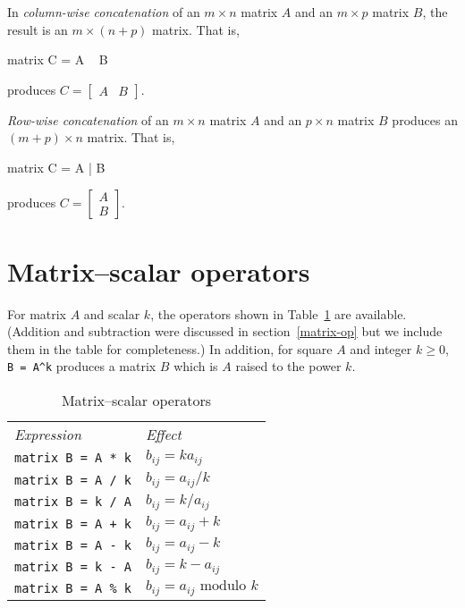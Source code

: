 In \textit{column-wise concatenation} of an $m\times n$ matrix $A$ and
an $m\times p$ matrix $B$, the result is an $m\times (n+p)$ matrix.
That is,
%
\begin{code}
matrix C = A ~ B
\end{code}
% 
produces $C = \left[ \begin{array}{cc} A & B \end{array} \right]$.

\textit{Row-wise concatenation} of an $m\times n$ matrix $A$ and
an $p\times n$ matrix $B$ produces an $(m+p) \times n$ matrix.
That is,
%
\begin{code}
matrix C = A | B
\end{code}
% 
produces $C = \left[ \begin{array}{cc} A \\ B \end{array} \right]$.

\section{Matrix--scalar operators}
\label{matrix-scalar-op}

For matrix $A$ and scalar $k$, the operators shown in
Table~\ref{tab:matrix-scalar-ops} are available.  (Addition and
subtraction were discussed in section~\ref{matrix-op} but we include
them in the table for completeness.)  In addition, for square $A$ and
integer $k \geq 0$, \verb|B = A^k| produces a matrix $B$ which is $A$
raised to the power $k$.

\begin{table}[htbp]
\centering
\begin{tabular}{ll}
\textit{Expression} & \textit{Effect} \\[4pt]
\texttt{matrix B = A * k} & $b_{ij} = k a_{ij}$ \\
\texttt{matrix B = A / k} & $b_{ij} = a_{ij} / k$ \\
\texttt{matrix B = k / A} & $b_{ij} = k / a_{ij}$ \\
\texttt{matrix B = A + k} & $b_{ij} = a_{ij} + k$ \\
\texttt{matrix B = A - k} & $b_{ij} = a_{ij} - k$ \\
\texttt{matrix B = k - A} & $b_{ij} = k - a_{ij}$ \\
\texttt{matrix B = A \% k} & $b_{ij} = a_{ij} \mbox{ modulo } k$ \\
\end{tabular}
\caption{Matrix--scalar operators}
\label{tab:matrix-scalar-ops}
\end{table}


